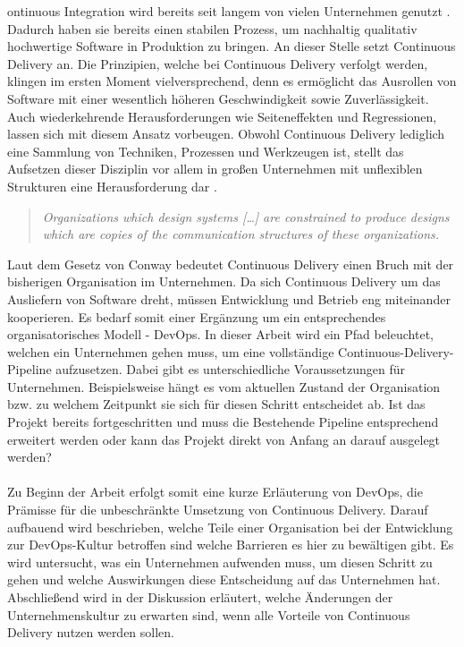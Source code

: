 ontinuous Integration wird bereits seit langem von vielen Unternehmen genutzt \cite{automic.2017}. Dadurch haben sie bereits einen stabilen Prozess, um nachhaltig qualitativ hochwertige Software in Produktion zu bringen. An dieser Stelle setzt Continuous Delivery an. Die Prinzipien, welche bei Continuous Delivery verfolgt werden, klingen im ersten Moment vielversprechend, denn es ermöglicht das Ausrollen von Software mit einer wesentlich höheren Geschwindigkeit sowie Zuverlässigkeit. Auch wiederkehrende Herausforderungen wie Seiteneffekten und Regressionen, lassen sich mit diesem Ansatz vorbeugen. Obwohl Continuous Delivery lediglich eine Sammlung von Techniken, Prozessen und Werkzeugen ist, stellt das Aufsetzen dieser Disziplin vor allem in großen Unternehmen mit unflexiblen Strukturen eine Herausforderung dar \cite{Wolff.2016}. 
\begin{quote} \textit{\glqq Organizations which design systems […] are constrained to produce designs which are copies of the communication structures of these organizations. \grqq~}\cite[S.5]{Farley.2011} \end{quote} 

Laut dem Gesetz von Conway bedeutet Continuous Delivery einen Bruch mit der bisherigen Organisation im Unternehmen. Da sich Continuous Delivery um das Ausliefern von Software dreht, müssen Entwicklung und Betrieb eng miteinander kooperieren. Es bedarf somit einer Ergänzung um ein entsprechendes organisatorisches Modell - DevOps. In dieser Arbeit wird ein Pfad beleuchtet, welchen ein Unternehmen gehen muss, um eine vollständige Continuous-Delivery-Pipeline aufzusetzen. Dabei gibt es unterschiedliche Voraussetzungen für Unternehmen. Beispielsweise hängt es vom aktuellen Zustand der Organisation bzw. zu welchem Zeitpunkt sie sich für diesen Schritt entscheidet ab. Ist das Projekt bereits fortgeschritten und muss die Bestehende Pipeline entsprechend erweitert werden oder kann das Projekt direkt von Anfang an darauf ausgelegt werden?
\\ \\ Zu Beginn der Arbeit erfolgt somit eine kurze Erläuterung von DevOps, die Prämisse für die unbeschränkte Umsetzung von Continuous Delivery. Darauf aufbauend wird beschrieben, welche Teile einer Organisation bei der Entwicklung zur DevOps-Kultur betroffen sind welche Barrieren es hier zu bewältigen gibt. Es wird untersucht, was ein Unternehmen aufwenden muss, um diesen Schritt zu gehen und welche Auswirkungen diese Entscheidung auf das Unternehmen hat. Abschließend wird in der Diskussion erläutert, welche Änderungen der Unternehmenskultur zu erwarten sind, wenn alle Vorteile von Continuous Delivery nutzen werden sollen.